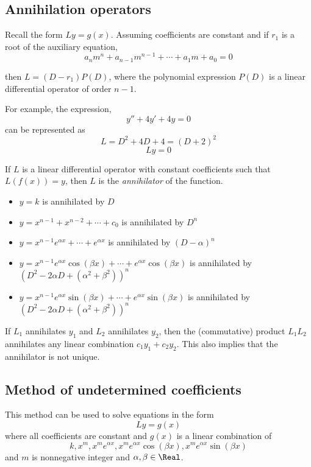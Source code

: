 \subsection{Annihilation operators}

Recall the form $Ly = g(x)$. Assuming coefficients are constant and if $r_1$ is a root of the auxiliary equation,
\[
    a_n m^n + a_{n - 1} m^{n - 1} + \cdots + a_1 m + a_0 = 0
\]

then $L = (D - r_1) P(D)$, where the polynomial expression $P(D)$ is a linear differential operator of order $n - 1$.

For example, the expression,
\[
    y'' + 4y' + 4y = 0
\]
can be represented as 
\[
    L = D^2 + 4D + 4 = {(D + 2)}^2
\]
\[
    Ly = 0
\]

\begin{definition}
    If $L$ is a linear differential operator with constant coefficients such that $L(f(x)) = y$, then $L$ is the \textit{annihilator} of the function.
\end{definition}

\begin{itemize}
    \item $y = k$ is annihilated by $D$
    \item $y = x^{n - 1} + x^{n - 2} + \cdots + c_0$ is annihilated by $D^n$
    \item $y = x^{n - 1}e^{\alpha x} + \cdots + e^{\alpha x}$ is annihilated by ${(D - \alpha)}^n$
    \item $y = x^{n - 1}e^{\alpha x}\cos(\beta x) + \cdots + e^{\alpha x}\cos(\beta x)$ is annihilated by ${(D^2 - 2\alpha D + (\alpha^2 + \beta^2))}^n$
    \item $y = x^{n - 1}e^{\alpha x}\sin(\beta x) + \cdots + e^{\alpha x}\sin(\beta x)$ is annihilated by ${(D^2 - 2\alpha D + (\alpha^2 + \beta^2))}^n$
\end{itemize}

If $L_1$ annihilates $y_1$ and $L_2$ annihilates $y_2$, then the (commutative) product $L_1 L_2$ annihilates any linear combination $c_1 y_1 + c_2 y_2$. This also implies that the annihilator is not unique.

\subsection{Method of undetermined coefficients}

This method can be used to solve equations in the form
\[
    Ly = g(x)
\]
where all coefficients are constant and $g(x)$ is a linear combination of
\[
    k, x^m, x^m e^{\alpha x}, x^m e^{\alpha x}\cos(\beta x), x^m e^{\alpha x}\sin(\beta x)
\]
and $m$ is nonnegative integer and $\alpha, \beta \in \Real$.

